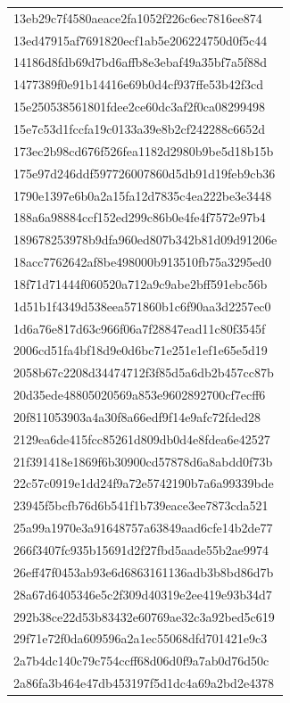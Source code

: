 \begin{tabular}{l}
13eb29c7f4580aeace2fa1052f226c6ec7816ee874 \\
13ed47915af7691820ecf1ab5e206224750d0f5c44 \\
14186d8fdb69d7bd6affb8e3ebaf49a35bf7a5f88d \\
1477389f0e91b14416e69b0d4cf937ffe53b42f3cd \\
15e250538561801fdee2ce60dc3af2f0ca08299498 \\
15e7c53d1fccfa19c0133a39e8b2cf242288c6652d \\
173ec2b98cd676f526fea1182d2980b9be5d18b15b \\
175e97d246ddf597726007860d5db91d19feb9cb36 \\
1790e1397e6b0a2a15fa12d7835c4ea222be3e3448 \\
188a6a98884ccf152ed299c86b0e4fe4f7572e97b4 \\
189678253978b9dfa960ed807b342b81d09d91206e \\
18acc7762642af8be498000b913510fb75a3295ed0 \\
18f71d71444f060520a712a9c9abe2bff591ebc56b \\
1d51b1f4349d538eea571860b1c6f90aa3d2257ec0 \\
1d6a76e817d63c966f06a7f28847ead11c80f3545f \\
2006cd51fa4bf18d9e0d6bc71e251e1ef1e65e5d19 \\
2058b67c2208d34474712f3f85d5a6db2b457cc87b \\
20d35ede48805020569a853e9602892700cf7ecff6 \\
20f811053903a4a30f8a66edf9f14e9afc72fded28 \\
2129ea6de415fcc85261d809db0d4e8fdea6e42527 \\
21f391418e1869f6b30900cd57878d6a8abdd0f73b \\
22c57c0919e1dd24f9a72e5742190b7a6a99339bde \\
23945f5bcfb76d6b541f1b739eace3ee7873cda521 \\
25a99a1970e3a91648757a63849aad6cfe14b2de77 \\
266f3407fc935b15691d2f27fbd5aade55b2ae9974 \\
26eff47f0453ab93e6d6863161136adb3b8bd86d7b \\
28a67d6405346e5c2f309d40319e2ee419e93b34d7 \\
292b38ce22d53b83432e60769ae32c3a92bed5c619 \\
29f71e72f0da609596a2a1ec55068dfd701421e9c3 \\
2a7b4dc140c79c754ccff68d06d0f9a7ab0d76d50c \\
2a86fa3b464e47db453197f5d1dc4a69a2bd2e4378 \\

\end{tabular}
